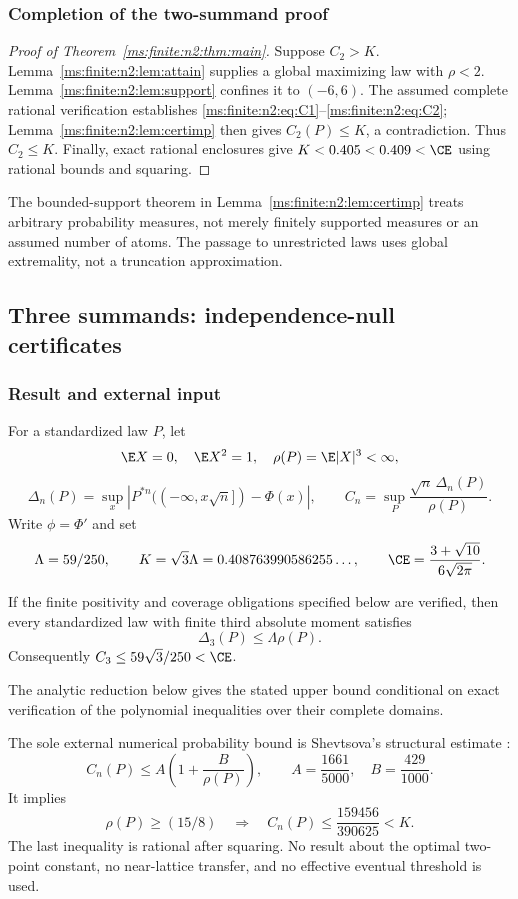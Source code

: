 \subsubsection{Completion of the two-summand proof}
\begin{proof}[Proof of Theorem~\ref{ms:finite:n2:thm:main}]
Suppose $C_2>K$. Lemma~\ref{ms:finite:n2:lem:attain} supplies a global maximizing law
with $\rho<2$. Lemma~\ref{ms:finite:n2:lem:support} confines it to $(-6,6)$.
The assumed complete rational verification establishes \eqref{ms:finite:n2:eq:C1}--\eqref{ms:finite:n2:eq:C2};
Lemma~\ref{ms:finite:n2:lem:certimp} then gives $C_2(P)\le K$, a contradiction.
Thus $C_2\le K$. Finally, exact rational enclosures give $K<0.405<0.409<\CE$
using rational bounds and squaring.
\end{proof}
The bounded-support theorem in Lemma~\ref{ms:finite:n2:lem:certimp} treats arbitrary
probability measures, not merely finitely supported measures or an assumed
number of atoms. The passage to unrestricted laws uses global extremality,
not a truncation approximation.


\subsection{Three summands: independence-null certificates}\label{ms:finite:n3:section}
\subsubsection{Result and external input}
For a standardized law $P$, let
\[
 \E X=0,\quad \E X^2=1,\quad \rho(P)=\E|X|^3<\infty,
\]
\[
 \Delta_n(P)=\sup_x\left|P^{*n}(( -\infty,x\sqrt n])-\Phi(x)\right|,
 \qquad C_n=\sup_P\frac{\sqrt n\,\Delta_n(P)}{\rho(P)}.
\]
Write $\phi=\Phi'$ and set
\[
 \Lambda=59/250,\qquad K=\sqrt3\Lambda
 =0.408763990586255\ldots,
 \qquad \CE=\frac{3+\sqrt{10}}{6\sqrt{2\pi}}.
\]
\begin{theorem}\label{ms:finite:n3:thm:main}
If the finite positivity and coverage obligations specified below are
verified, then every standardized law with finite third absolute moment satisfies
\[
 \boxed{\Delta_3(P)\le\Lambda\rho(P).}
\]
Consequently $C_3\le59\sqrt3/250<\CE$.
\end{theorem}
The analytic reduction below gives the stated upper bound conditional on
exact verification of the polynomial inequalities over their complete domains.

The sole external numerical probability bound is Shevtsova's structural
estimate \cite{Shevtsova2013}:
\begin{equation}\label{ms:finite:n3:eq:struct}
 C_n(P)\le A\left(1+\frac B{\rho(P)}\right),
 \qquad A=\frac{1661}{5000},\quad B=\frac{429}{1000}.
\end{equation}
It implies
\begin{equation}\label{ms:finite:n3:eq:large}
 \rho(P)\ge(15/8)\quad\Longrightarrow\quad
 C_n(P)\le\frac{159456}{390625}<K.
\end{equation}
The last inequality is rational after squaring. No result about the optimal
two-point constant, no near-lattice transfer, and no effective eventual
threshold is used.

